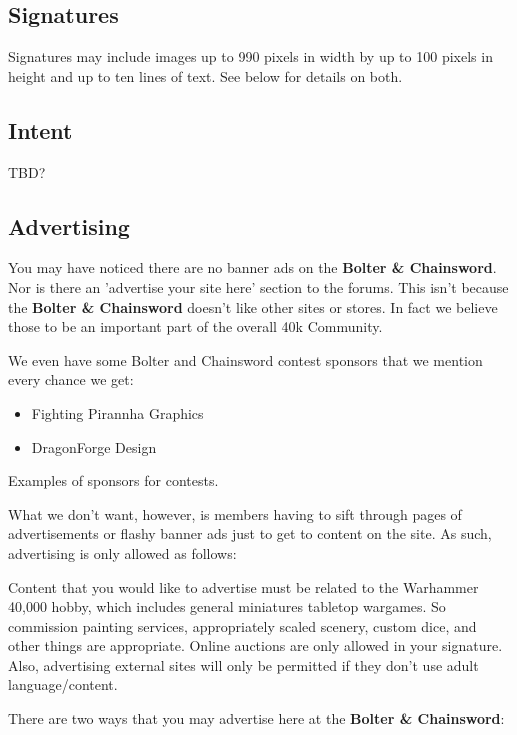 \documentclass[12pt]{article}
\newcommand{\bnc}{{\textbf{Bolter \& Chainsword}}}%
\begin{document}
\subsection{Signatures}

Signatures may include images up to 990 pixels in width by up to 100 
pixels in height and up to ten lines of text. See below for details on 
both.

\subsection{Intent}

TBD?

\subsection{Advertising}

You may have noticed there are no banner ads on the {\bnc}. Nor is there 
an 'advertise your site here' section to the forums. This isn't because 
the {\bnc} doesn't like other sites or stores. In fact we believe those to 
be an important part of the overall 40k Community.

We even have some Bolter and Chainsword contest sponsors that we 
mention every chance we get:

\begin{table}[H]
\begin{itemize}
\item Fighting Pirannha Graphics
\item DragonForge Design
\end{itemize}
	\caption{Examples of sponsors for contests.}
\end{table}

What we don't want, however, is members having to sift through pages of 
advertisements or flashy banner ads just to get to content on the site. 
As such, advertising is only allowed as follows:

Content that you would like to advertise must be related to the 
Warhammer 40,000 hobby, which includes general miniatures tabletop 
wargames. So commission painting services, appropriately scaled 
scenery, custom dice, and other things are appropriate. Online auctions 
are only allowed in your signature. Also, advertising external sites 
will only be permitted if they don't use adult language/content.

There are two ways that you may advertise here at the {\bnc}:
\end{document}
